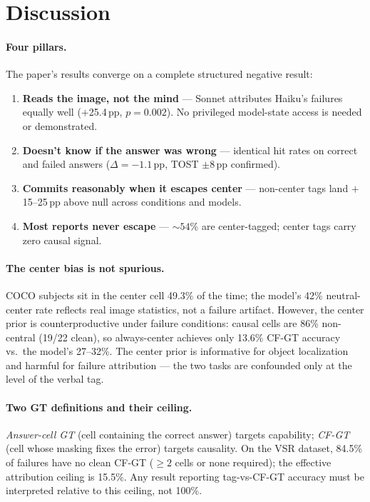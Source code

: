 \documentclass[twoside,11pt]{article}
\begin{document}
\section{Discussion}
\label{sec:discussion}

\paragraph{Four pillars.}
The paper's results converge on a complete structured negative result:

\begin{enumerate}
  \item \textbf{Reads the image, not the mind} — Sonnet attributes Haiku's failures
    equally well ($+$25.4\,pp, $p{=}0.002$).
    No privileged model-state access is needed or demonstrated.
  \item \textbf{Doesn't know if the answer was wrong} — identical hit rates on
    correct and failed answers ($\Delta = -1.1$\,pp, TOST $\pm 8$\,pp confirmed).
  \item \textbf{Commits reasonably when it escapes center} — non-center tags land
    $+$15--25\,pp above null across conditions and models.
  \item \textbf{Most reports never escape} — ${\sim}54$\% are center-tagged;
    center tags carry zero causal signal.
\end{enumerate}

\paragraph{The center bias is not spurious.}
COCO subjects sit in the center cell 49.3\% of the time; the model's 42\%
neutral-center rate reflects real image statistics, not a failure artifact.
However, the center prior is counterproductive under failure conditions:
causal cells are 86\% non-central (19/22 clean), so always-center achieves
only 13.6\% CF-GT accuracy vs.\ the model's 27--32\%.
The center prior is informative for object localization and harmful for
failure attribution — the two tasks are confounded only at the level of the
verbal tag.

\paragraph{Two GT definitions and their ceiling.}
\textit{Answer-cell GT} (cell containing the correct answer) targets capability;
\textit{CF-GT} (cell whose masking fixes the error) targets causality.
On the VSR dataset, 84.5\% of failures have no clean CF-GT ($\geq 2$ cells or
none required); the effective attribution ceiling is 15.5\%.
Any result reporting tag-vs-CF-GT accuracy must be interpreted relative to this
ceiling, not 100\%.
\end{document}
